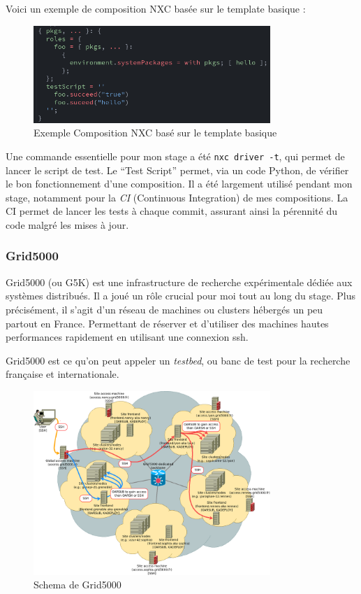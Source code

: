 \documentclass[a4paper,french,12pt, titlepage]{article}
\begin{document}
Voici un exemple de composition NXC basée sur le template basique :

\begin{figure}[h]
\centering
\includegraphics[width=0.8\textwidth,height=0.8\textheight,keepaspectratio]{images/template-hellow.png}
\caption{Exemple Composition NXC basé sur le template basique}
\end{figure}

Une commande essentielle pour mon stage a été \texttt{nxc\ driver\ -t},
qui permet de lancer le script de test. Le ``Test Script'' permet, via
un code Python, de vérifier le bon fonctionnement d'une composition. Il
a été largement utilisé pendant mon stage, notamment pour la \emph{CI}
(Continuous Integration) de mes compositions. La CI permet de lancer les
tests à chaque commit, assurant ainsi la pérennité du code malgré les
mises à jour.\newline

\hypertarget{grid5000}{%
\subsubsection{Grid5000}\label{grid5000}}

Grid5000 (ou G5K) est une infrastructure de recherche expérimentale
dédiée aux systèmes distribués. Il a joué un rôle crucial pour moi tout
au long du stage. Plus précisément, il s'agit d'un réseau de machines ou
clusters hébergés un peu partout en France. Permettant de réserver et
d'utiliser des machines hautes performances rapidement en utilisant une
connexion ssh.

Grid5000 est ce qu'on peut appeler un \emph{testbed}, ou banc de test
pour la recherche française et internationale.\newline

\begin{figure}[h]
\centering
\includegraphics[width=0.8\textwidth,height=0.8\textheight,keepaspectratio]{images/shemag5k.png}
\caption{Schema de Grid5000}
\end{figure}
\end{document}
